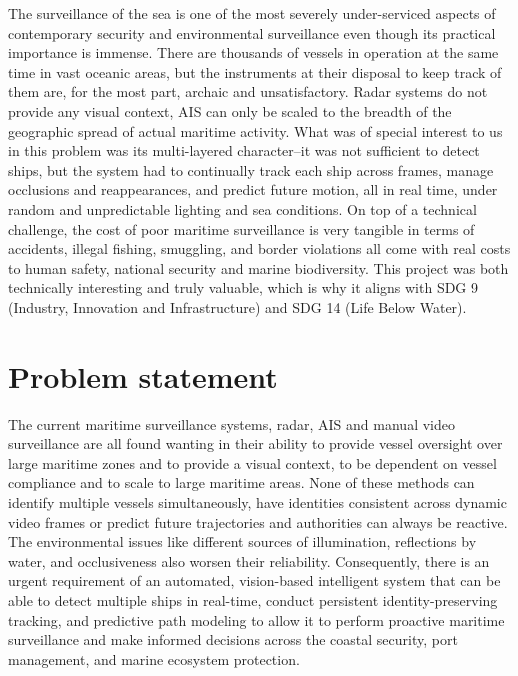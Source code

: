 
The surveillance of the sea is one of the most severely under-serviced aspects of contemporary security and environmental surveillance even though its practical importance is immense. There are thousands of vessels in operation at the same time in vast oceanic areas, but the instruments at their disposal to keep track of them are, for the most part, archaic and unsatisfactory. Radar systems do not provide any visual context, AIS can only be scaled to the breadth of the geographic spread of actual maritime activity. What was of special interest to us in this problem was its multi-layered character--it was not sufficient to detect ships, but the system had to continually track each ship across frames, manage occlusions and reappearances, and predict future motion, all in real time, under random and unpredictable lighting and sea conditions. On top of a technical challenge, the cost of poor maritime surveillance is very tangible in terms of accidents, illegal fishing, smuggling, and border violations all come with real costs to human safety, national security and marine biodiversity. This project was both technically interesting and truly valuable, which is why it aligns with SDG 9 (Industry, Innovation and Infrastructure) and SDG 14 (Life Below Water).


\section[Problem statement]{\textbf{Problem statement}}


The current maritime surveillance systems, radar, AIS and manual video surveillance are all found wanting in their ability to provide vessel oversight over large maritime zones and to provide a visual context, to be dependent on vessel compliance and to scale to large maritime areas. None of these methods can identify multiple vessels simultaneously, have identities consistent across dynamic video frames or predict future trajectories and authorities can always be reactive. The environmental issues like different sources of illumination, reflections by water, and occlusiveness also worsen their reliability. Consequently, there is an urgent requirement of an automated, vision-based intelligent system that can be able to detect multiple ships in real-time, conduct persistent identity-preserving tracking, and predictive path modeling to allow it to perform proactive maritime surveillance and make informed decisions across the coastal security, port management, and marine ecosystem protection.


